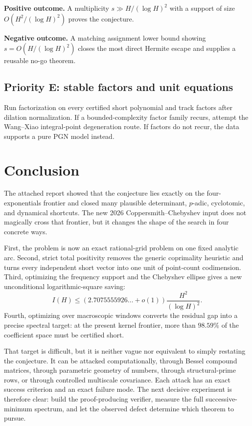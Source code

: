 \documentclass[11pt,oneside]{article}
\theoremstyle{definition}
\theoremstyle{remark}
\begin{document}
\textbf{Positive outcome.}  A multiplicity
$s\gg H/(\log H)^2$ with a support of size $O(H^2/(\log H)^2)$ proves the conjecture.

\textbf{Negative outcome.}  A matching assignment lower bound showing
$s=O(H/(\log H)^2)$ closes the most direct Hermite escape and supplies a reusable no-go theorem.

\subsection{Priority E: stable factors and unit equations}

Run factorization on every certified short polynomial and track factors after dilation
normalization.  If a bounded-complexity factor family recurs, attempt the Wang--Xiao
integral-point degeneration route.  If factors do not recur, the data supports a pure PGN
model instead.

\section{Conclusion}

The attached report showed that the conjecture lies exactly on the four-exponentials frontier
and closed many plausible determinant, $p$-adic, cyclotomic, and dynamical shortcuts.  The new
2026 Coppersmith--Chebyshev input does not magically cross that frontier, but it changes the
shape of the search in four concrete ways.

First, the problem is now an exact rational-grid problem on one fixed analytic arc.  Second,
strict total positivity removes the generic coprimality heuristic and turns every independent
short vector into one unit of point-count codimension.  Third, optimizing the frequency support
and the Chebyshev ellipse gives a new unconditional logarithmic-square saving:
\[
 I(H)\le(2.7075555926\ldots+o(1))\frac{H^2}{(\log H)^2}.
\]
Fourth, optimizing over macroscopic windows converts the residual gap into a precise spectral
target: at the present kernel frontier, more than $98.59\%$ of the coefficient space must be
certified short.

That target is difficult, but it is neither vague nor equivalent to simply restating the
conjecture.  It can be attacked computationally, through Bessel compound matrices, through
parametric geometry of numbers, through structural-prime rows, or through controlled
multiscale covariance.  Each attack has an exact success criterion and an exact failure mode.
The next decisive experiment is therefore clear: build the proof-producing verifier, measure
the full successive-minimum spectrum, and let the observed defect determine which theorem to
pursue.
\end{document}
